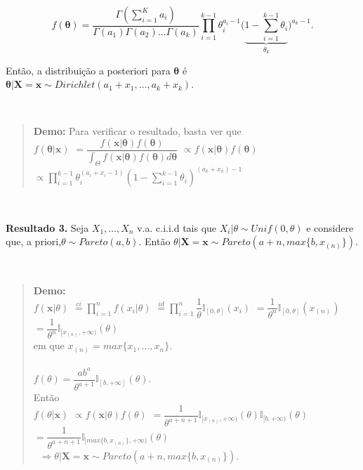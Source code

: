 \documentclass[
]{book}
\begin{document}
\[f(\boldsymbol \theta) = \dfrac{\Gamma(\sum_{i=1}^K a_i)}{\Gamma(a_1)\Gamma(a_2)\ldots\Gamma(a_k)}\prod_{i=1}^{k-1}\theta_i^{a_i-1}\bigg(\underbrace{1-\sum_{i=1}^{k-1}\theta_i}_{\theta_k}\bigg)^{a_k-1}.\]

Então, a distribuição a posteriori para \(\boldsymbol \theta\) é
\(\boldsymbol \theta|\boldsymbol X = \boldsymbol x \sim Dirichlet (a_1+x_1,\ldots,a_k+x_k)\).

\(~\)

\begin{quote}
\textbf{Demo:} Para verificar o resultado, basta ver que\\
\(f(\boldsymbol\theta|\boldsymbol x)\) \(=\dfrac{f(\boldsymbol x| \boldsymbol \theta)f(\boldsymbol \theta)}{\int_\Theta f(\boldsymbol x| \boldsymbol \theta)f(\boldsymbol \theta)d\boldsymbol \theta}\) \(\propto f(\boldsymbol x| \boldsymbol \theta)f(\boldsymbol \theta)\) \(\propto \prod_{i=1}^{k-1}\theta_i^{(a_i+x_i-1)}\left(1-\sum_{i=1}^{k-1}\theta_i\right)^{(a_k+x_k)-1}\)
\end{quote}

\(~\)

\textbf{Resultado 3.} Seja \(X_1,\ldots,X_n\) v.a. c.i.i.d tais que \(X_i|\theta \sim Unif(0,\theta)\) e considere que, a priori,\(\theta \sim Pareto(a,b)\). Então \(\theta|\boldsymbol X = \boldsymbol x \sim Pareto\left(a+n,max\{b,x_{(n)}\}\right)\).

\(~\)

\begin{quote}
\textbf{Demo:}\\
\(f(\boldsymbol x|\theta)\) \(\overset{ci}{=}\prod_{i=1}^nf(x_i|\theta)\) \(\overset{id}{=}\prod_{i=1}^n\dfrac{1}{\theta}\mathbb{I}_{[0,\theta]}(x_i)\) \(=\dfrac{1}{\theta^n}\mathbb{I}_{[0,\theta]}(x_{(n)})\) \(=\dfrac{1}{\theta^n}\mathbb{I}_{[x_{(n)},+\infty)}(\theta)\)\\
em que \(x_{(n)}=max\{x_1,\ldots,x_n\}\).\\
\(~\)\\
\(f(\theta)=\dfrac{ab^a}{\theta^{a+1}}\mathbb{I}_{[b,+\infty]}(\theta)\).\\
Então\\
\(f(\theta| \boldsymbol x)\) \(\propto f(\boldsymbol x|\theta)f(\theta)\) \(=\dfrac{1}{\theta^{a+n+1}}\mathbb{I}_{[x_{(n)},+\infty)}(\theta)\mathbb{I}_{[b,+\infty)}(\theta)\) \(=\dfrac{1}{\theta^{a+n+1}}\mathbb{I}_{[max\{b,x_{(n)}\},+\infty)}(\theta)\)\\
\(~\)
\(\Rightarrow \theta|\boldsymbol X = \boldsymbol x \sim Pareto(a+n,max\{b,x_{(n)}\})\).
\end{quote}
\end{document}
